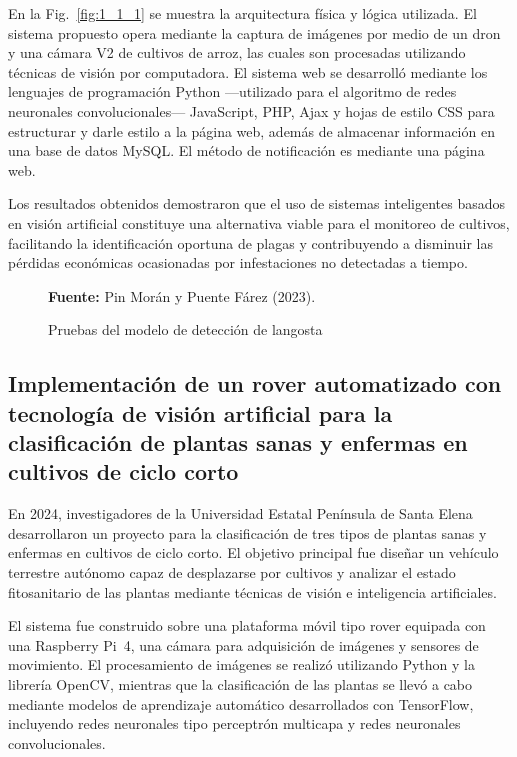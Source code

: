 En la Fig.~\ref{fig:1_1_1} se muestra la arquitectura física y lógica utilizada. El sistema propuesto opera mediante la captura de imágenes por medio de un dron y una cámara V2 de cultivos de arroz, las cuales son procesadas utilizando técnicas de visión por computadora. El sistema web se desarrolló mediante los lenguajes de programación Python ---utilizado para el algoritmo de redes neuronales convolucionales--- JavaScript, PHP, Ajax y hojas de estilo CSS para estructurar y darle estilo a la página web, además de almacenar información en una base de datos MySQL. El método de notificación es mediante una página web.

Los resultados obtenidos demostraron que el uso de sistemas inteligentes basados en visión artificial constituye una alternativa viable para el monitoreo de cultivos, facilitando la identificación oportuna de plagas y contribuyendo a disminuir las pérdidas económicas ocasionadas por infestaciones no detectadas a tiempo.

\begin{figure}[H]
    \centering
    \caption{Pruebas del modelo de detección de langosta}
    \label{fig:1_1_2}
    \vspace{0.2cm}
    \footnotesize \textbf{Fuente:} Pin Morán y Puente Fárez (2023).
\end{figure}


\subsection{Implementación de un rover automatizado con tecnología de visión artificial para la clasificación de plantas sanas y enfermas en cultivos de ciclo corto}

En 2024, investigadores de la Universidad Estatal Península de Santa Elena desarrollaron un proyecto para la clasificación de tres tipos de plantas sanas y enfermas en cultivos de ciclo corto. El objetivo principal fue diseñar un vehículo terrestre autónomo capaz de desplazarse por cultivos y analizar el estado fitosanitario de las plantas mediante técnicas de visión e inteligencia artificiales.

El sistema fue construido sobre una plataforma móvil tipo rover equipada con una Raspberry Pi~4, una cámara para adquisición de imágenes y sensores de movimiento. El procesamiento de imágenes se realizó utilizando Python y la librería OpenCV, mientras que la clasificación de las plantas se llevó a cabo mediante modelos de aprendizaje automático desarrollados con TensorFlow, incluyendo redes neuronales tipo perceptrón multicapa y redes neuronales convolucionales.

